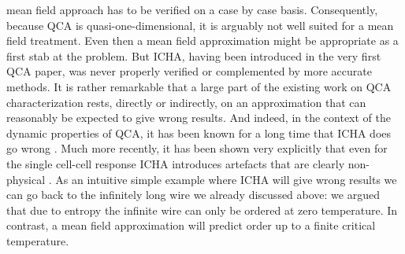 mean field approach has to be verified on a case by case basis.  Consequently,
because QCA is quasi-one-dimensional, it is arguably not well suited for a mean
field treatment. Even then a mean field approximation might be appropriate as a
first stab at the problem. But ICHA, having been introduced in the very first
QCA paper, was never properly verified or complemented by more accurate methods.
It is rather remarkable that a large part of the existing work on QCA
characterization rests, directly or indirectly, on an approximation that can
reasonably be expected to give wrong results. And indeed, in the context of the
dynamic properties of QCA, it has been known for a long time that ICHA does go
wrong \cite{toth2001role}. Much more recently, it has been shown very explicitly
that even for the single cell-cell response ICHA introduces artefacts that are
clearly non-physical \cite{taucer2012consequences}. As an intuitive simple
example where ICHA will give wrong results we can go back to the infinitely long
wire we already discussed above: we argued that due to entropy the infinite wire
can only be ordered at zero temperature. In contrast, a mean field approximation
will predict order up to a finite critical temperature. 


